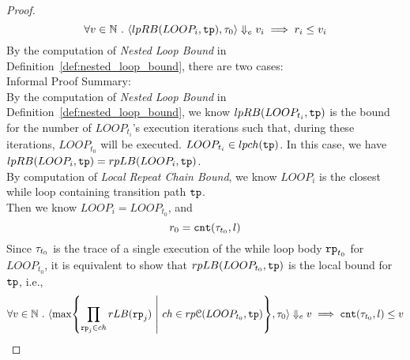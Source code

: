 \begin{proof}
% 
        \[
          \forall v \in \mathbb{N} ~.~ 
          \langle lpRB(LOOP_i, \mathtt{tp}), \mathtt{\tau}_0
           \rangle \Downarrow_e v_i 
          \implies  
          r_i \leq v_i
        \]   
  By the computation of \emph{Nested Loop Bound} in Definition~\ref{def:nested_loop_bound},
        there are two cases:
  \\
  Informal Proof Summary: 
  \\
  By the computation of \emph{Nested Loop Bound} in Definition~\ref{def:nested_loop_bound}, we know 
$lpRB(LOOP_{t_i}, \mathtt{tp})$ is the
bound for the number of $LOOP_{t_i}$'s execution iterations
such that, during these iterations, $LOOP_{t_0}$ will be executed. 
$LOOP_{t_i} \in lpch(\mathtt{tp})$.
%
        In this case, we have $lpRB(LOOP_i, \mathtt{tp}) = rpLB(LOOP_i, \mathtt{tp})$.
        \\
        By computation of \emph{Local Repeat Chain Bound}, we know 
        $LOOP_i$ is the closest while loop containing transition path $\mathtt{tp}$.
        \\
        Then we know $LOOP_i = LOOP_{t_0}$, and 
        \[
          r_0 = \mathtt{cnt}(\mathtt{\tau}_{t_0}, l)
        \]
    Since $\mathtt{\tau}_{t_0}$ is the trace of a single execution of the while loop body $\mathtt{rp}_{t_0}$ for $LOOP_{t_0}$,
    it is equivalent to show that $rpLB(LOOP_{t_0}, \mathtt{tp})$ is the local bound for $\mathtt{tp}$, i.e.,
        \[
            \forall v \in \mathbb{N} \st
            \config{
        \max \left\{ \prod\limits_{\rprog_j \in ch}  rLB(\rprog_j) 
        ~\middle\vert~ ch \in rp\mathcal{C}(LOOP_{t_0}, \tpath) \right\}, \trace_0
          } \earrow v \implies  \vcounter(\vtrace_{t_0}, l) \leq v
        \]

\end{proof}

